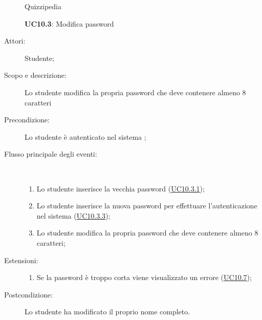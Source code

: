 \begin{figure}[H]
	\centering
	\begin{resizedtikzpicture}{\textwidth}
		\begin{umlsystem}[x=0, fill=lightgray!20]{Quizzipedia}
		\end{umlsystem}
	\end{resizedtikzpicture}
	\caption{\textbf{UC10.3}: Modifica password}
	\label{UC10.3}
\end{figure}
\begin{description}
	\item[Attori:] Studente;
	\item[Scopo e descrizione:] Lo studente modifica la propria password che deve contenere almeno 8 caratteri
	\item[Precondizione:] Lo studente è autenticato nel sistema
	;
	
	\item[Flusso principale degli eventi:] \ 
	\begin{enumerate}
		\item Lo studente inserisce la vecchia password (\hyperlink{UC10.3.1}{UC10.3.1});
		\item Lo studente inserisce la nuova password per effettuare l'autenticazione nel sistema (\hyperlink{UC10.3.3}{UC10.3.3});
		\item Lo studente modifica la propria password che deve contenere almeno 8 caratteri;
		
	\end{enumerate}
	\item[Estensioni:]
	\begin{enumerate}
		\item Se la password è troppo corta viene visualizzato un errore	 (\hyperlink{UC10.7}{UC10.7});
		
	\end{enumerate}
	\item[Postcondizione:] Lo studente ha modificato il proprio nome completo.
\end{description}
\hypertarget{UC10.3.1}{}
